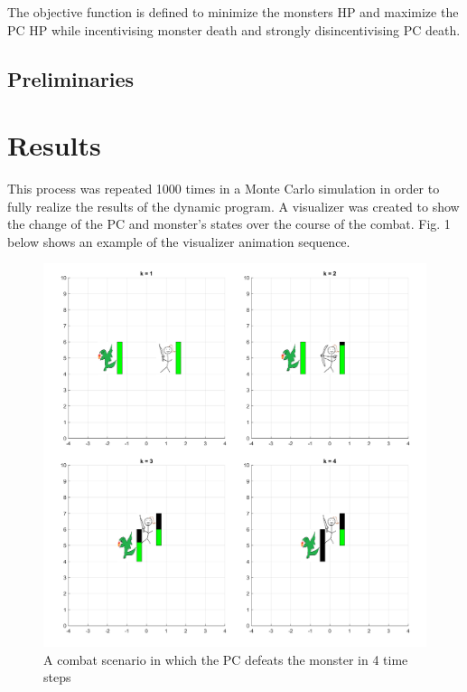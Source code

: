 \documentclass[letterpaper, 10 pt, conference]{ieeeconf}
\begin{document}
The objective function is defined to minimize the monsters HP and maximize the PC HP while incentivising monster death and strongly disincentivising PC death.



\subsection{Preliminaries}








\section{Results}
This process was repeated 1000 times in a Monte Carlo simulation in order to fully realize the results of the 
dynamic program. A visualizer was created to show the change of the PC and monster's states over the course of the 
combat. Fig. 1 below shows an example of the visualizer animation sequence.

\pagebreak

\begin{figure}[h]
\centering
\includegraphics[scale = 0.2]{figs/DND_SingleSim_Animation_rng_seed=1997.png}
\caption{A combat scenario in which the PC defeats the monster in 4 time steps}
\end{figure}
\end{document}
